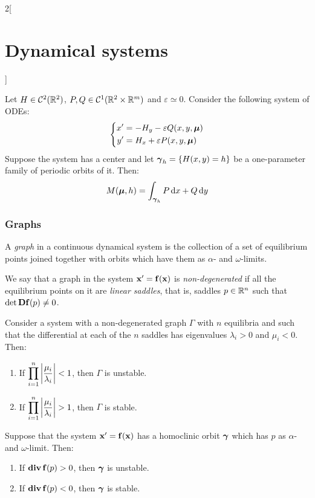 \documentclass[../../../main_math.tex]{subfiles}
\begin{document}
\begin{multicols}{2}[\section{Dynamical systems}]
\begin{theorem}
  \end{theorem}
  \begin{corollary}
    Let $H\in\mathcal{C}^2(\mathbb{R}^2)$, $P,Q\in\mathcal{C}^1(\mathbb{R}^2\times\mathbb{R}^m)$ and $\varepsilon\simeq 0$. Consider the following system of ODEs:
    \begin{equation*}
      \left\{
      \begin{aligned}
        x' & =-H_y -\varepsilon Q(x,y,\boldsymbol{\mathrm{\mu}}) \\
        y' & =H_x +\varepsilon P(x,y,\boldsymbol{\mathrm{\mu}})
      \end{aligned}
      \right.
    \end{equation*}
    Suppose the system has a center and let $\boldsymbol{\mathrm{\gamma}}_h=\{H(x,y)=h\}$ be a one-parameter family of periodic orbits of it. Then: $$M(\boldsymbol{\mathrm{\mu}},h)=\int_{\boldsymbol{\mathrm{\gamma}}_h}P\dd{x}+Q\dd{y}$$
  \end{corollary}
  \subsubsection{Graphs}
  \begin{definition}
    A \emph{graph} in a continuous dynamical system is the collection of a set of equilibrium points joined together with orbits which have them as $\alpha$- and $\omega$-limits.
  \end{definition}
  \begin{definition}
    We say that a graph in the system $\boldsymbol{\mathrm{x}}'=\boldsymbol{\mathrm{f}}(\boldsymbol{\mathrm{x}})$ is \emph{non-degenerated} if all the equilibrium points on it are \emph{linear saddles}, that is, saddles $p\in\mathbb{R}^n$ such that $\det\boldsymbol{\mathrm{Df}}(p)\ne 0$.
  \end{definition}
  \begin{proposition}
    Consider a system with a non-degenerated graph $\Gamma$ with $n$ equilibria and such that the differential at each of the $n$ saddles has eigenvalues $\lambda_i > 0$ and $\mu_i<0$. Then:
    \begin{enumerate}
      \item If $\displaystyle\prod_{i=1}^n\abs{\frac{\mu_i}{\lambda_i}}<1$, then $\Gamma$ is unstable.
      \item If $\displaystyle\prod_{i=1}^n\abs{\frac{\mu_i}{\lambda_i}}>1$, then $\Gamma$ is stable.
    \end{enumerate}
  \end{proposition}
  \begin{corollary}
    Suppose that the system $\boldsymbol{\mathrm{x}}'=\boldsymbol{\mathrm{f}}(\boldsymbol{\mathrm{x}})$ has a homoclinic orbit $\boldsymbol{\mathrm{\gamma}}$ which has $p$ as $\alpha$- and $\omega$-limit. Then:
    \begin{enumerate}
      \item If $\operatorname{\boldsymbol{\mathrm{div}}} \boldsymbol{\mathrm{f}}(p)>0$, then $\boldsymbol{\mathrm{\gamma}}$ is unstable.
      \item If $\operatorname{\boldsymbol{\mathrm{div}}} \boldsymbol{\mathrm{f}}(p)<0$, then $\boldsymbol{\mathrm{\gamma}}$ is stable.
    \end{enumerate}
  \end{corollary}

\end{multicols}
\end{document}
